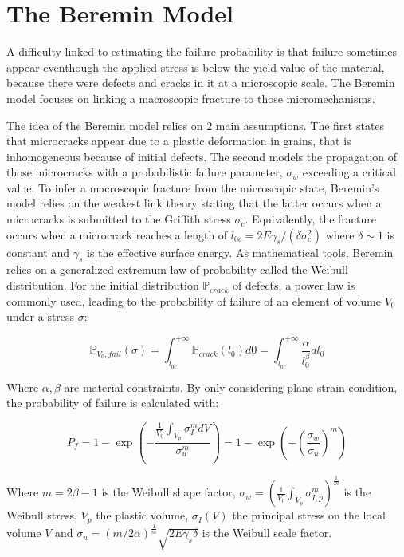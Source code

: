 \documentclass[
10pt, %
a4paper, %
oneside, %
headinclude,footinclude, %
BCOR5mm, %
]{scrartcl}
\begin{document}
\section{The Beremin Model}

A difficulty linked to estimating the failure probability is that failure
sometimes appear eventhough the applied stress is below the yield value
of the material, because there were defects and cracks in it at a
microscopic scale.
The Beremin model focuses on linking a macroscopic fracture to those micromechanisms.

The idea of the Beremin model relies on $2$ main assumptions.
The first states that microcracks appear due to a plastic
deformation in grains, that is inhomogeneous because of initial defects.
The second models the propagation of those microcracks with a
probabilistic failure parameter, $\sigma_w$ exceeding a critical value.
To infer a macroscopic fracture from the microscopic state,
Beremin's model relies on the weakest link theory stating that the latter
occurs when a microcracks is submitted to the Griffith stress $\sigma_c$.
Equivalently, the fracture occurs when a microcrack reaches a length of
$l_{0c} = 2E\gamma_s /(\delta\sigma_c^2)$ where $\delta \sim 1$ is constant
and $\gamma_s$ is the effective surface energy.
As mathematical tools, Beremin relies on a generalized extremum law
of probability called the Weibull distribution.
For the initial distribution $\mathbb{P}_{crack}$ of defects,
a power law is commonly used, leading to the probability of
failure of an element of volume $V_0$ under a stress $\sigma$:

\begin{equation} \label{eq:pfail}
    \mathbb{P}_{V_0,fail}(\sigma) = \displaystyle \int_{l_{0c}}^{+\infty} \mathbb{P}_{crack}(l_0)d0
    = \int_{l_{0c}}^{+\infty} \frac{\alpha}{l_0^{\beta}}dl_0
\end{equation}

Where $\alpha,\beta$ are material constraints.
By only considering plane strain condition, the probability of
failure is calculated with:

\begin{equation}
    P_{f}
    = 1 - \exp\left(- \frac{ \displaystyle  \frac{1}{V_0} \int_{V_p} \sigma_{I}^m dV }{\sigma_u^m}\right)
    = 1 - \exp\left(-\left(\frac{\sigma_w}{\sigma_u}\right)^m\right)
\end{equation}

Where $m = 2\beta - 1$ is the Weibull shape factor, $\sigma_w = \displaystyle \left( \frac{1}{V_0} \int_{V_p} \sigma_{I,p}^m \right)^{\frac{1}{m}}$
is the Weibull stress, $V_p$ the plastic volume, $\sigma_I(V)$ the principal
stress on the local volume $V$
and $\sigma_u = (m/2\alpha)^{\frac{1}{m}}\sqrt{2E\gamma_s\delta}$
is the Weibull scale factor.
\end{document}
